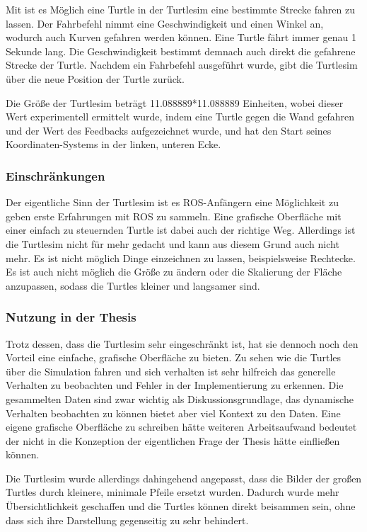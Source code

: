 Mit  ist es Möglich eine Turtle in der Turtlesim eine bestimmte Strecke fahren zu lassen. Der Fahrbefehl nimmt eine Geschwindigkeit und einen Winkel an, wodurch auch Kurven gefahren werden können. Eine Turtle fährt immer genau 1 Sekunde lang. Die Geschwindigkeit bestimmt demnach auch direkt die gefahrene Strecke der Turtle. Nachdem ein Fahrbefehl ausgeführt wurde, gibt die Turtlesim über  die neue Position der Turtle zurück.

Die Größe der Turtlesim beträgt 11.088889*11.088889 Einheiten, wobei dieser Wert experimentell ermittelt wurde, indem eine Turtle gegen die Wand gefahren und der Wert des Feedbacks aufgezeichnet wurde, und hat den Start seines Koordinaten-Systems in der linken, unteren Ecke.

\subsubsection*{Einschränkungen}
Der eigentliche Sinn der Turtlesim ist es \ac{ROS}-Anfängern eine Möglichkeit zu geben erste Erfahrungen mit \ac{ROS} zu sammeln. Eine grafische Oberfläche mit einer einfach zu steuernden Turtle ist dabei auch der richtige Weg. Allerdings ist die Turtlesim nicht für mehr gedacht und kann aus diesem Grund auch nicht mehr. Es ist nicht möglich Dinge einzeichnen zu lassen, beispielsweise Rechtecke. Es ist auch nicht möglich die Größe zu ändern oder die Skalierung der Fläche anzupassen, sodass die Turtles kleiner und langsamer sind.

\subsubsection*{Nutzung in der Thesis}
Trotz dessen, dass die Turtlesim sehr eingeschränkt ist, hat sie dennoch noch den Vorteil eine einfache, grafische Oberfläche zu bieten. Zu sehen wie die Turtles über die Simulation fahren und sich verhalten ist sehr hilfreich das generelle Verhalten zu beobachten und Fehler in der Implementierung zu erkennen. Die gesammelten Daten sind zwar wichtig als Diskussionsgrundlage, das dynamische Verhalten beobachten zu können bietet aber viel Kontext zu den Daten.
Eine eigene grafische Oberfläche zu schreiben hätte weiteren Arbeitsaufwand bedeutet der nicht in die Konzeption der eigentlichen Frage der Thesis hätte einfließen können.

Die Turtlesim wurde allerdings dahingehend angepasst, dass die Bilder der großen Turtles durch kleinere, minimale Pfeile ersetzt wurden. Dadurch wurde mehr Übersichtlichkeit geschaffen und die Turtles können direkt beisammen sein, ohne dass sich ihre Darstellung gegenseitig zu sehr behindert.
